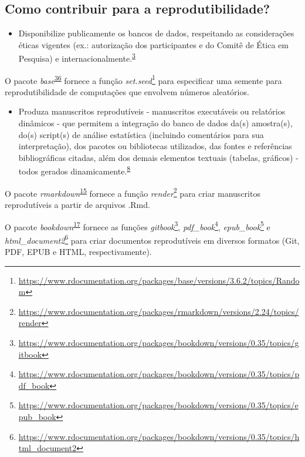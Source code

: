 \documentclass[
  a4paper,
]{book}
\providecommand{\tightlist}{%
  \setlength{\itemsep}{0pt}\setlength{\parskip}{0pt}}
\renewcommand{\href}[2]{#2\footnote{\url{#1}}}
\newenvironment{infobox}[1]
  {
  \begin{itemize}
  \renewcommand{\labelitemi}{
    \raisebox{-.7\height}[0pt][0pt]{
      {\setkeys{Gin}{width=3em,keepaspectratio}
        \texttt{[image: \#1]}}
    }
  }
  \setlength{\fboxsep}{1em}
  \begin{blackbox}
  \item
  }
  {
  \end{blackbox}
  \end{itemize}
  }
\begin{document}
\hypertarget{como-contribuir-para-a-reprodutibilidade}{%
\subsection{Como contribuir para a reprodutibilidade?}\label{como-contribuir-para-a-reprodutibilidade}}

\begin{itemize}
\tightlist
\item
  Disponibilize publicamente os bancos de dados, respeitando as considerações éticas vigentes (ex.: autorização dos participantes e do Comitê de Ética em Pesquisa) e internacionalmente.\textsuperscript{\protect\hyperlink{ref-mair2016}{3}}
\end{itemize}

\begin{infobox}{images/Rlogo}
O pacote \emph{base}\textsuperscript{\protect\hyperlink{ref-base-5}{36}} fornece a função \href{https://www.rdocumentation.org/packages/base/versions/3.6.2/topics/Random}{\emph{set.seed}} para especificar uma semente para reprodutibilidade de computações que envolvem números aleatórios.

\end{infobox}

\begin{itemize}
\tightlist
\item
  Produza manuscritos reprodutíveis - manuscritos executáveis ou relatórios dinâmicos - que permitem a integração do banco de dados da(s) amostra(s), do(s) script(s) de análise estatística (incluindo comentários para sua interpretação), dos pacotes ou bibliotecas utilizados, das fontes e referências bibliográficas citadas, além dos demais elementos textuais (tabelas, gráficos) - todos gerados dinamicamente.\textsuperscript{\protect\hyperlink{ref-hinsen2011}{8}}
\end{itemize}

\begin{infobox}{images/Rlogo}
O pacote \emph{rmarkdown}\textsuperscript{\protect\hyperlink{ref-rmarkdown}{15}} fornece a função \href{https://www.rdocumentation.org/packages/rmarkdown/versions/2.24/topics/render}{\emph{render}} para criar manuscritos reprodutíveis a partir de arquivos .Rmd.

\end{infobox}

\begin{infobox}{images/Rlogo}
O pacote \emph{bookdown}\textsuperscript{\protect\hyperlink{ref-bookdown-2}{17}} fornece as funções \href{https://www.rdocumentation.org/packages/bookdown/versions/0.35/topics/gitbook}{\emph{gitbook}}, \href{https://www.rdocumentation.org/packages/bookdown/versions/0.35/topics/pdf_book}{\emph{pdf\_book}}, \href{https://www.rdocumentation.org/packages/bookdown/versions/0.35/topics/epub_book}{\emph{epub\_book}} e \href{https://www.rdocumentation.org/packages/bookdown/versions/0.35/topics/html_document2}{\emph{html\_document2}} para criar documentos reprodutíveis em diversos formatos (Git, PDF, EPUB e HTML, respectivamente).

\end{infobox}
\end{document}
